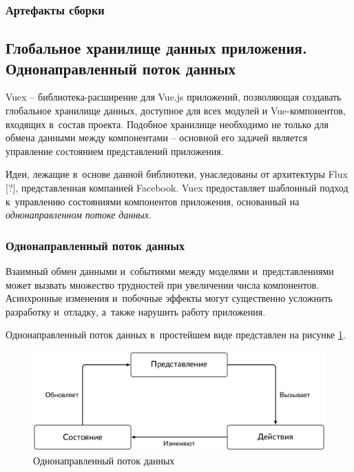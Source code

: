 \subsubsection{Артефакты сборки}



\subsection{Глобальное хранилище данных приложения. Однонаправленный поток данных}

Vuex -- библиотека-расширение для Vue.js приложений, позволяющая создавать глобальное хранилище данных, доступное для всех модулей и Vue-компонентов, входящих в~состав проекта. Подобное хранилище необходимо не только для обмена данными между компонентами -- основной его задачей является управление состоянием представлений приложения.

Идеи, лежащие в~основе данной библиотеки, унаследованы от архитектуры Flux [?], представленная компанией Facebook. Vuex предоставляет шаблонный подход к~управлению состояниями компонентов приложения, основанный на \emph{однонаправленном потоке данных}.


\subsubsection{Однонаправленный поток данных}

Взаимный обмен данными и~событиями между моделями и~представлениями может вызвать множество трудностей при увеличении числа компонентов. Асинхронные изменения и~побочные эффекты могут существенно усложнить разработку и~отладку, а~также нарушить работу приложения.

Однонаправленный поток данных в~простейшем виде представлен на рисунке \ref{fig:simple-oneway-data-flow}.

\begin{figure}[h!]
  \centering
  \setlength{\fboxsep}{5pt}
  \includegraphics[width=.9\textwidth]{img/tikz/simple-oneway-data-flow/pic}
  \vspace*{12pt}
  \caption{Однонаправленный поток данных}\label{fig:simple-oneway-data-flow}
\end{figure}

